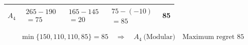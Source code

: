 {\begin{minipage}[t]{0.51\textwidth}
\begin{tabular}{@{}lcccc@{}}
    $A_4$ & $\begin{gathered}265-190\\=75\end{gathered}$ & $\begin{gathered}165-145\\=20\end{gathered}$ & $\begin{gathered}75-(-10)\\=85\end{gathered}$ & 85\\
    \bottomrule
  \end{tabular}
\end{minipage}
\[
  \min\{150,110,110,85\}=85
  \quad\Longrightarrow\quad
  \boxed{A_4\ \text{(Modular)}\quad\text{Maximum regret }85}
\]
}

\clearpage
{}
